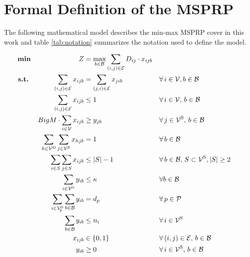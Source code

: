 \clearpage

\newpage
\appendix
\onecolumn
\renewcommand{\paragraph}[1]{\bigskip\noindent\textbf{#1}\quad} %


\section{Formal Definition of the MSPRP}
\label{appendix:notation}

The following mathematical model describes the min-max MSPRP cover in this work and table \ref{tab:notation} summarizes the notation used to define the model.

\begin{align}
  \label{eq:obj_fn}
  \textbf{min} \qquad \qquad \qquad \quad Z &= \underset{b \in \mathcal{B}}{\text{max}} \sum_{(i,j) \in \mathcal{E}} D_{ij} \cdot x_{ijb} \\
    \label{eq:flow_cnstr}
    \textbf{s.t.} \qquad \quad \; \; \sum_{(i,j) \in \mathcal{E}} x_{ijb} &=  \sum_{(j,i) \in \mathcal{E}} x_{jib} &&\forall \, i \in \mathcal{V}, b \in \mathcal{B} \\
    \label{eq:no_mult_visits}
    \sum_{(i,j) \in \mathcal{E}} x_{ijb} &\leq 1 &&\forall \, i \in \mathcal{V}, \, b \in \mathcal{B} \\
    \label{eq:take_only_if_visit}
    BigM \cdot \sum_{i \in \mathcal{V}} x_{ijb} &\geq y_{jb} && \forall \, j \in \mathcal{V}^{\text{S}} , \,b \in \mathcal{B} \\
    \label{eq:include_depot}
    \sum_{h \in \mathcal{V}^{\text{D}}} \sum_{j \in \mathcal{V}^{\text{S}}} x_{hjb} &= 1 && \forall \, b \in \mathcal{B} \\
     \label{eq:subtour}
    \sum_{i\in S} \sum_{j \in S} x_{ijb} &\leq |S| -1 && \forall \, b \in \mathcal{B}, \,  S \subset \mathcal{V}^{\text{S}}, |S| \geq 2 \\
    \label{eq:capacity}
     \sum_{i \in \mathcal{V}^{\text{S}}} y_{ib} &\leq \kappa && \forall b \in \mathcal{B}\\
    \label{eq:meet_demand}
    \sum_{i \in \mathcal{V}_{\!p}^\text{S}} \sum_{b \in \mathcal{B}} y_{ib} &= d_p && \forall \, p \in \mathcal{P} \\
    \label{eq:no_exceed_sup}
    \sum_{b \in \mathcal{B}} y_{ib} &\leq n_{i} && \forall \, i \in \mathcal{V}^{\text{S}} \\
    \label{eq:def_x}
     x_{ijb} &\in \{0,1\} && \forall \, (i,j) \in \mathcal{E},\, b \in \mathcal{B} \\
    \label{eq:def_y}
     y_{ib} &\geq 0 && \forall \,  i \in \mathcal{V}^{\text{S}}, \, b \in \mathcal{B}
\end{align}

